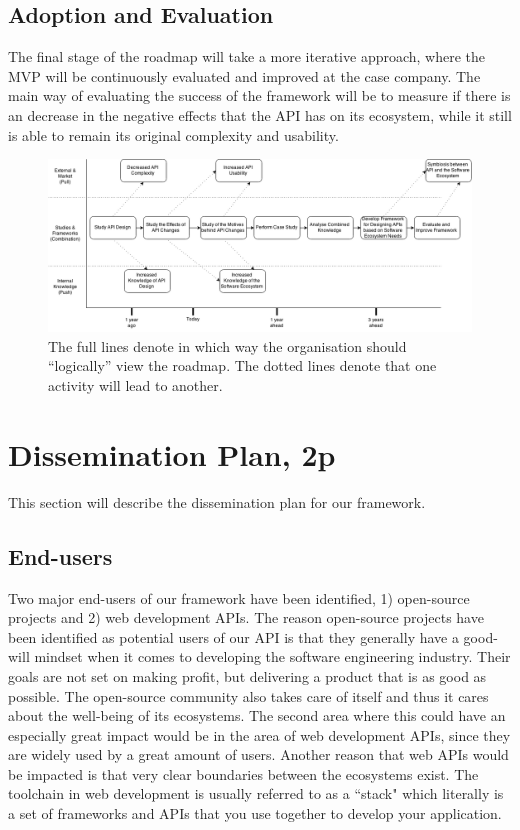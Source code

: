 \documentclass{article}
\begin{document}
\subsection{Adoption and Evaluation}
The final stage of the roadmap will take a more iterative approach, where the MVP will be continuously evaluated and improved at the case company. The main way of evaluating the success of the framework will be to measure if there is an decrease in the negative effects that the API has on its ecosystem, while it still is able to remain its original complexity and usability. 

\begin{figure}
\centering
\includegraphics[width=220mm]{RoadMap.png}
\caption{The full lines denote in which way the organisation should ``logically'' view the roadmap. The dotted lines denote that one activity will lead to another. }
\label{fig:roadmap}
\end{figure}

\section{Dissemination Plan, 2p}
This section will describe the dissemination plan for our framework. 

\subsection{End-users}

Two major end-users of our framework have been identified, 1) open-source projects and 2) web development APIs. The reason open-source projects have been identified as potential users of our API is that they generally have a good-will mindset when it comes to developing the software engineering industry. Their goals are not set on making profit, but delivering a product that is as good as possible. The open-source community also takes care of itself and thus it cares about the well-being of its ecosystems. The second area where this could have an especially great impact would be in the area of web development APIs, since they are widely used by a great amount of users. Another reason that web APIs would be impacted is that very clear boundaries between the ecosystems exist. The toolchain in web development is usually referred to as a ``stack" which literally is a set of frameworks and APIs that you use together to develop your application. 
\end{document}
